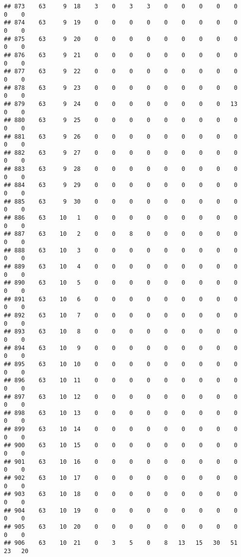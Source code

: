 \documentclass[]{article}
\begin{document}
\begin{verbatim}
## 873    63     9  18    3    0    3    3    0    0    0    0    0    0    0
## 874    63     9  19    0    0    0    0    0    0    0    0    0    0    0
## 875    63     9  20    0    0    0    0    0    0    0    0    0    0    0
## 876    63     9  21    0    0    0    0    0    0    0    0    0    0    0
## 877    63     9  22    0    0    0    0    0    0    0    0    0    0    0
## 878    63     9  23    0    0    0    0    0    0    0    0    0    0    0
## 879    63     9  24    0    0    0    0    0    0    0    0   13    0    0
## 880    63     9  25    0    0    0    0    0    0    0    0    0    0    0
## 881    63     9  26    0    0    0    0    0    0    0    0    0    0    0
## 882    63     9  27    0    0    0    0    0    0    0    0    0    0    0
## 883    63     9  28    0    0    0    0    0    0    0    0    0    0    0
## 884    63     9  29    0    0    0    0    0    0    0    0    0    0    0
## 885    63     9  30    0    0    0    0    0    0    0    0    0    0    0
## 886    63    10   1    0    0    0    0    0    0    0    0    0    0    0
## 887    63    10   2    0    0    8    0    0    0    0    0    0    0    0
## 888    63    10   3    0    0    0    0    0    0    0    0    0    0    0
## 889    63    10   4    0    0    0    0    0    0    0    0    0    0    0
## 890    63    10   5    0    0    0    0    0    0    0    0    0    0    0
## 891    63    10   6    0    0    0    0    0    0    0    0    0    0    0
## 892    63    10   7    0    0    0    0    0    0    0    0    0    0    0
## 893    63    10   8    0    0    0    0    0    0    0    0    0    0    0
## 894    63    10   9    0    0    0    0    0    0    0    0    0    0    0
## 895    63    10  10    0    0    0    0    0    0    0    0    0    0    0
## 896    63    10  11    0    0    0    0    0    0    0    0    0    0    0
## 897    63    10  12    0    0    0    0    0    0    0    0    0    0    0
## 898    63    10  13    0    0    0    0    0    0    0    0    0    0    0
## 899    63    10  14    0    0    0    0    0    0    0    0    0    0    0
## 900    63    10  15    0    0    0    0    0    0    0    0    0    0    0
## 901    63    10  16    0    0    0    0    0    0    0    0    0    0    0
## 902    63    10  17    0    0    0    0    0    0    0    0    0    0    0
## 903    63    10  18    0    0    0    0    0    0    0    0    0    0    0
## 904    63    10  19    0    0    0    0    0    0    0    0    0    0    0
## 905    63    10  20    0    0    0    0    0    0    0    0    0    0    0
## 906    63    10  21    0    3    5    0    8   13   15   30   51   23   20

\end{verbatim}
\end{document}
